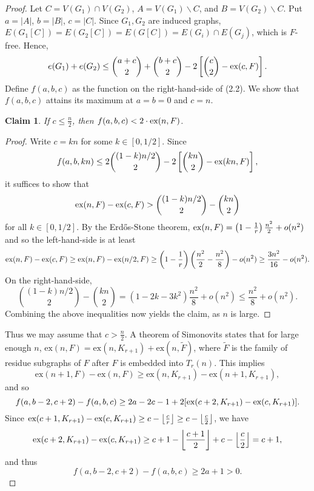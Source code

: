 \documentclass[12pt]{report}
\newtheorem{claim}{Claim}
\newcommand*{\ex}{\textnormal{ex}}
\begin{document}
\begin{proof}
  Let $C = V(G_1) \cap V(G_2)$, $A = V(G_1) \backslash C$, and $B = V(G_2) \backslash C$. Put $a = |A|$, $b = |B|$, $c = |C|$. Since $G_1, G_2$ are induced graphs, $E(G_1[C]) = E(G_2[C]) = E(G[C]) = E(G_i) \cap E(G_j)$, which is $F$-free. Hence, 
  \begin{gather}
    e(G_1) + e(G_2) \leq \binom{a + c}{2} +  \binom{b + c}{2} - 2\left[\binom{c}{2} - \ex(c, F)\right].
  \end{gather}
  Define $f(a, b, c)$ as the function on the right-hand-side of (2.2). We show that $f(a, b, c)$ attains its maximum at $a = b = 0$ and $c = n$. 

  \begin{claim}
    If $c \leq \frac{n}{2}$, then $f(a, b, c) < 2 \cdot \ex(n, F)$.
  \end{claim}

  \begin{proof}
    Write $c = kn$ for some $k \in [0, 1/2]$. Since
    \[
      f(a, b, kn) \leq 2\binom{(1 - k)n/2}{2} - 2\left[\binom{kn}{2} - \ex(kn, F)\right],
    \]
    it suffices to show that
    \[
      \ex(n, F) - \ex(c, F) > \binom{(1 - k)n/2}{2} - \binom{kn}{2}
    \]
    for all $k \in [0, 1/2]$. By the Erdős-Stone theorem, $\ex(n, F) = \left(1 - \frac{1}{r}\right)\frac{n^2}{2} + o(n^2)$ and so the left-hand-side is at least
    \[
      \ex(n, F) - \ex(c, F) \geq \ex(n, F) - \ex(n/2, F) \geq \left(1 - \frac{1}{r}\right)\left(\frac{n^2}{2} - \frac{n^2}{8}\right) - o(n^2) \geq \frac{3n^2}{16} - o(n^2).
    \]
    On the right-hand-side, 
    \[
      \binom{(1 - k)n/2}{2} - \binom{kn}{2} = (1 - 2k - 3k^2)\frac{n^2}{8} + o(n^2) \leq \frac{n^2}{8} + o(n^2).
    \]
    Combining the above inequalities now yields the claim, as $n$ is large.
  \end{proof}
  Thus we may assume that $c > \frac{n}{2}$. A theorem of Simonovits states that for large enough $n$, $\text{ex}(n, F) = \text{ex}(n, K_{r + 1}) + \text{ex}(n, \tilde{F})$, where $\tilde{F}$ is the family of residue subgraphs of $F$ after $F$ is embedded into $T_r(n)$. This implies 
  \[
    \text{ex}(n + 1, F) - \text{ex}(n, F) \geq \text{ex}(n, K_{r + 1}) - \text{ex}(n + 1, K_{r + 1}),
  \]
  and so
  \[
    f(a, b - 2, c + 2) - f(a, b, c) \geq 2a - 2c - 1 + 2[\ex(c + 2, K_{r + 1}) - \ex(c, K_{r + 1})].
  \]
  Since $\ex(c + 1, K_{r + 1}) - \ex(c, K_{r + 1}) \geq c - \left\lfloor \frac{c}{r} \right\rfloor \geq c - \left\lfloor \frac{c}{2} \right\rfloor$, we have
  \[
    \ex(c + 2, K_{r + 1}) - \ex(c, K_{r + 1}) \geq c + 1 - \left\lfloor \frac{c + 1}{2} \right\rfloor + c - \left\lfloor \frac{c}{2} \right\rfloor = c + 1,
  \]
  and thus 
  \[
    f(a, b - 2, c + 2) - f(a, b, c) \geq 2a + 1 > 0.
  \]


\end{proof}
\end{document}
